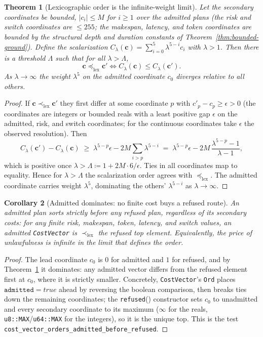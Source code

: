 \documentclass[11pt,oneside]{book}
\theoremstyle{definition}
\theoremstyle{plain}
\newtheorem{theorem}{Theorem}[chapter]
\newtheorem{corollary}[theorem]{Corollary}
\theoremstyle{remark}
\newcommand{\CostV}{\bm c}                     %
\newcommand{\code}[1]{\texttt{#1}}
\begin{document}
\begin{theorem}[Lexicographic order is the infinite-weight limit]\label{thm:lex}
Let the secondary coordinates be bounded, $|c_i|\le M$ for $i\ge 1$ over the admitted plans
(the risk and switch coordinates are $\le 255$; the makespan, latency, and token coordinates
are bounded by the structural depth and duration constants of
Theorem~\ref{thm:bounded-ground}). Define the scalarization
$C_\lambda(\CostV)=\sum_{i=0}^{5}\lambda^{5-i}c_i$ with $\lambda>1$. Then there is a threshold
$\Lambda$ such that for all $\lambda>\Lambda$,
\[
\CostV\preceq_{\mathrm{lex}}\CostV' \iff C_\lambda(\CostV)\le C_\lambda(\CostV').
\]
As $\lambda\to\infty$ the weight $\lambda^{5}$ on the admitted coordinate $c_0$ diverges
relative to all others.
\end{theorem}

\begin{proof}
If $\CostV\prec_{\mathrm{lex}}\CostV'$ they first differ at some coordinate $p$ with
$c'_p-c_p\ge\epsilon>0$ (the coordinates are integers or bounded reals with a least positive
gap $\epsilon$ on the admitted, risk, and switch coordinates; for the continuous coordinates
take $\epsilon$ the observed resolution). Then
\[
C_\lambda(\CostV')-C_\lambda(\CostV)\;\ge\;\lambda^{5-p}\epsilon
-2M\!\!\sum_{i>p}\lambda^{5-i}\;=\;\lambda^{5-p}\epsilon-2M\,\frac{\lambda^{5-p}-1}{\lambda-1},
\]
which is positive once $\lambda>\Lambda\coloneqq 1+2M\cdot 6/\epsilon$. Ties in all
coordinates map to equality. Hence for $\lambda>\Lambda$ the scalarization order agrees with
$\preceq_{\mathrm{lex}}$. The admitted coordinate carries weight $\lambda^{5}$, dominating the
others' $\lambda^{5-i}$ as $\lambda\to\infty$. \end{proof}

\begin{corollary}[Admitted dominates: no finite cost buys a refused route]\label{cor:dominate}
An admitted plan sorts strictly before any refused plan, regardless of its secondary costs:
for any finite risk, makespan, token, latency, and switch values, an admitted
\code{CostVector} is $\prec_{\mathrm{lex}}$ the refused top element. Equivalently, the price of
unlawfulness is infinite in the limit that defines the order.
\end{corollary}

\begin{proof}
The lead coordinate $c_0$ is $0$ for admitted and $1$ for refused, and by
Theorem~\ref{thm:lex} it dominates: any admitted vector differs from the refused element first
at $c_0$, where it is strictly smaller. Concretely, \code{CostVector}'s \code{Ord} places
$\code{admitted}=true$ ahead by reversing the boolean comparison, then breaks ties down the
remaining coordinates; the \code{refused}() constructor sets $c_0$ to unadmitted and every
secondary coordinate to its maximum ($\infty$ for the reals, \code{u8::MAX}/\code{u64::MAX} for
the integers), so it is the unique top. This is the test
\code{cost\_vector\_orders\_admitted\_before\_refused}. \end{proof}
\end{document}
